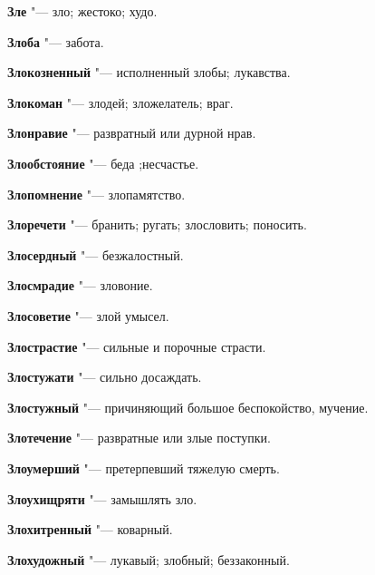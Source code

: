 \begin{mymulticols}{2}
\noindent\textbf{Зле} "--- зло; жестоко; худо. 




\noindent\textbf{Злоба} "--- забота. 




\noindent\textbf{Злокозненный} "--- исполненный злобы; лукавства. 




\noindent\textbf{Злокоман} "--- злодей; зложелатель; враг. 




\noindent\textbf{Злонравие} "--- развратный или дурной нрав. 




\noindent\textbf{Злообстояние} "--- беда ;несчастье. 




\noindent\textbf{Злопомнение} "--- злопамятство. 




\noindent\textbf{Злоречети} "--- бранить; ругать; злословить; поносить. 




\noindent\textbf{Злосердный} "--- безжалостный. 




\noindent\textbf{Злосмрадие} "--- зловоние. 




\noindent\textbf{Злосоветие} "--- злой умысел. 




\noindent\textbf{Злострастие} "--- сильные и порочные страсти. 




\noindent\textbf{Злостужати} "--- сильно досаждать. 




\noindent\textbf{Злостужный} "--- причиняющий большое беспокойство, мучение. 




\noindent\textbf{Злотечение} "--- развратные или злые поступки. 




\noindent\textbf{Злоумерший} "--- претерпевший тяжелую смерть. 




\noindent\textbf{Злоухищряти} "--- замышлять зло. 




\noindent\textbf{Злохитренный} "--- коварный. 




\noindent\textbf{Злохудожный} "--- лукавый; злобный; беззаконный. 





\end{mymulticols}
